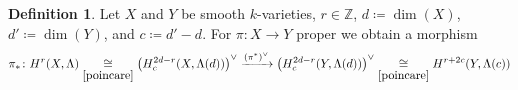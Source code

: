 \documentclass[english]{scrartcl}
\theoremstyle{definition}
\newtheorem{Def}{Definition}[section]
\newtheorem{Cor}[Def]{Corollary}
\theoremstyle{remark}
\newcommand*{\Z}{\mathds{Z}}
\begin{document}

\begin{Def}\label{def:pushforward}
  Let $X$ and $Y$ be smooth $k$-varieties, $r\in\Z$,
  $d\coloneqq\dim(X)$, $d'\coloneqq\dim(Y)$, and $c\coloneqq d'-d$.
  For $\pi\colon X\to Y$ proper we obtain a morphism
  \begin{gather*}
    \pi_*\colon
    H^r(X,\Lambda)
    \underset{\ref{poincare}}\cong
    \left(H_c^{2d-r}(X,\Lambda(d))\right)^\vee
    \xrightarrow{(\pi^*)^\vee}
    \left(H_c^{2d-r}(Y,\Lambda(d))\right)^\vee
    \underset{\ref{poincare}}\cong
    H^{r+2c}(Y,\Lambda(c))
  \end{gather*}
\end{Def}
\end{document}

